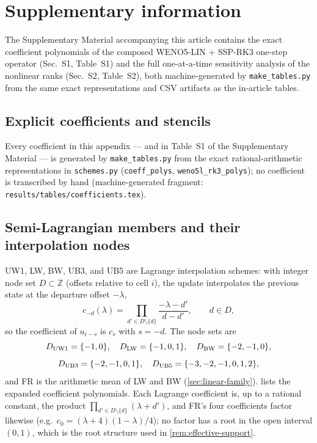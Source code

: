 \documentclass[pdflatex,sn-mathphys-num]{sn-jnl}%
\theoremstyle{thmstyleone}%
\theoremstyle{thmstyletwo}%
\theoremstyle{thmstylethree}%
\begin{document}
\section*{Supplementary information}

The Supplementary Material accompanying this article contains the exact coefficient polynomials of the composed WENO5-LIN + SSP-RK3 one-step operator (Sec.~S1, Table~S1) and the full one-at-a-time sensitivity analysis of the nonlinear ranks (Sec.~S2, Table~S2), both machine-generated by \texttt{make\_tables.py} from the same exact representations and CSV artifacts as the in-article tables.

\begin{appendices}

\section{Explicit coefficients and stencils}\label{app:coefficients}

Every coefficient in this appendix --- and in Table~S1 of the Supplementary Material --- is generated by \texttt{make\_tables.py} from the exact rational-arithmetic representations in \texttt{schemes.py} (\texttt{coeff\_polys}, \texttt{weno5l\_rk3\_polys}); no coefficient is transcribed by hand (machine-generated fragment: \texttt{results/tables/coefficients.tex}).

\subsection{Semi-Lagrangian members and their interpolation nodes}
\label{app:sl-coefficients}

UW1, LW, BW, UB3, and UB5 are Lagrange interpolation schemes: with integer node set $D\subset\mathbb Z$ (offsets relative to cell $i$), the update interpolates the previous state at the departure offset $-\lambda$, \[ c_{-d}(\lambda)=\prod_{d'\in D\setminus\{d\}} \frac{-\lambda-d'}{d-d'},\qquad d\in D, \] so the coefficient of $u_{i-s}$ is $c_s$ with $s=-d$.
The node sets are \[ D_{\rm UW1}=\{-1,0\},\quad D_{\rm LW}=\{-1,0,1\},\quad D_{\rm BW}=\{-2,-1,0\}, \] \[ D_{\rm UB3}=\{-2,-1,0,1\},\quad D_{\rm UB5}=\{-3,-2,-1,0,1,2\}, \] and FR is the arithmetic mean of LW and BW (\cref{sec:linear-family}).
 lists the expanded coefficient polynomials.
Each Lagrange coefficient is, up to a rational constant, the product $\prod_{d'\in D\setminus\{d\}} (\lambda+d')$, and FR's four coefficients factor likewise (e.g.\ $c_0=(\lambda+4)(1-\lambda)/4$); no factor has a root in the open interval $(0,1)$, which is the root structure used in \cref{rem:effective-support}.


\end{appendices}
\end{document}
